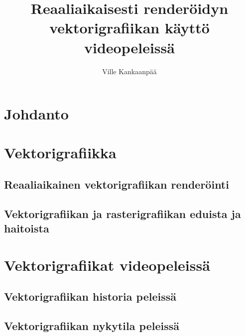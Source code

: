 \documentclass[utf8,bachelor]{gradu3}
\begin{document}
\title{Reaaliaikaisesti renderöidyn vektorigrafiikan käyttö videopeleissä}


\author{Ville Kankaanpää}

\maketitle

\mainmatter


\chapter{Johdanto}

\chapter{Vektorigrafiikka}

\section{Reaaliaikainen vektorigrafiikan renderöinti}

\section{Vektorigrafiikan ja rasterigrafiikan eduista ja haitoista}

\chapter{Vektorigrafiikat videopeleissä}

\section{Vektorigrafiikan historia peleissä}

\section{Vektorigrafiikan nykytila peleissä}
\end{document}
